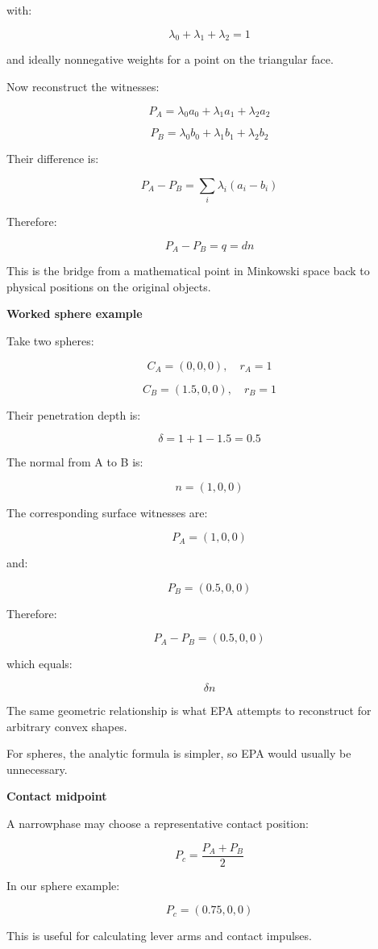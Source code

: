 with:

\[
\lambda_0+\lambda_1+\lambda_2=1
\]

and ideally nonnegative weights for a point on the triangular face.

Now reconstruct the witnesses:

\[
\boxed{ P_A=\lambda_0a_0+\lambda_1a_1+\lambda_2a_2 }
\]

\[
\boxed{ P_B=\lambda_0b_0+\lambda_1b_1+\lambda_2b_2 }
\]

Their difference is:

\[
P_A-P_B = \sum_i\lambda_i(a_i-b_i)
\]

Therefore:

\[
\boxed{ P_A-P_B=q=dn }
\]

This is the bridge from a mathematical point in Minkowski space back to physical positions on the original objects.

\textbf{Worked sphere example}

Take two spheres:

\[
C_A=(0,0,0),\quad r_A=1
\]

\[
C_B=(1.5,0,0),\quad r_B=1
\]

Their penetration depth is:

\[
\delta=1+1-1.5=0.5
\]

The normal from A to B is:

\[
n=(1,0,0)
\]

The corresponding surface witnesses are:

\[
P_A=(1,0,0)
\]

and:

\[
P_B=(0.5,0,0)
\]

Therefore:

\[
P_A-P_B=(0.5,0,0)
\]

which equals:

\[
\delta n
\]

The same geometric relationship is what EPA attempts to reconstruct for arbitrary convex shapes.

For spheres, the analytic formula is simpler, so EPA would usually be unnecessary.

\textbf{Contact midpoint}

A narrowphase may choose a representative contact position:

\[
\boxed{ P_c=\frac{P_A+P_B}{2} }
\]

In our sphere example:

\[
P_c=(0.75,0,0)
\]

This is useful for calculating lever arms and contact impulses.

